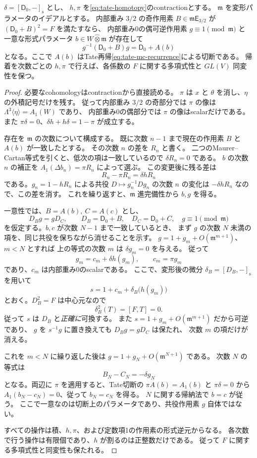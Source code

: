 \begin{lemma}[Tate切断への形式的な帰着と一意性]
\label{lem:v12-marked-tate-slice}
$\delta=[\mathsf D_0,-]_{\mathrm s}$ とし、
$h,\pi$ を\eqref{eq:tate-homotopy}のcontractionとする。
$\mathfrak m$ を変形パラメータのイデアルとする。
内部重み $3/2$ の奇作用素 $B\in\mathfrak m\mathsf E_{3/2}$ が
$(\mathsf D_0+B)^2=F$ を満たすなら、
内部重み0の偶可逆作用素 $g\equiv1\pmod{\mathfrak m}$ と
一意な形式パラメータ $b\in W\widehat\otimes\mathfrak m$ が存在して
\[
 g^{-1}(\mathsf D_0+B)g=\mathsf D_0+A(b)
\]
となる。ここで $A(b)$ はTate再帰\eqref{eq:tate-mc-recurrence}による切断である。
帰着を次数ごとの $h,\pi$ で行えば、各係数の $F$ に関する多項式性と
$GL(V)$ 同変性を保つ。
\end{lemma}
\begin{proof}
必要なcohomologyはcontractionから直接読める。
$\pi$ は $x$ と $\theta$ を消し、$\eta$ の外積記号だけを残す。
従って内部重み $3/2$ の奇部分では $\pi$ の像は
$\Lambda^3\langle\eta\rangle=A_1(W)$ であり、
内部重み0の偶部分では $\pi$ の像はscalarだけである。
また $\pi\delta=0$、$\delta h+h\delta=1-\pi$ が成立する。

存在を $\mathfrak m$ の次数について構成する。
既に次数 $n-1$ まで現在の作用素 $B$ と $A(b)$ が一致したとする。
その次数 $n$ の差を $R_n$ と書く。
二つのMaurer--Cartan等式を引くと、低次の項は一致しているので
$\delta R_n=0$ である。
$b$ の次数 $n$ の補正を
$A_1(\Delta b_n)=\pi R_n$ によって選ぶ。
この変更後に残る差は
\[
 R_n-\pi R_n=\delta hR_n
\]
である。$g_n=1-hR_n$ による共役
$D\mapsto g_n^{-1}Dg_n$ の次数 $n$ の変化は
$-\delta hR_n$ なので、この差を消す。
これを繰り返すと、$\mathfrak m$ 進完備性から $b,g$ を得る。

一意性では、$B=A(b),\ C=A(c)$ とし、
\[
 D_Bg=gD_C,\qquad D_B=\mathsf D_0+B,\quad
 D_C=\mathsf D_0+C,\quad g\equiv1\pmod{\mathfrak m}
\]
を仮定する。$b,c$ が次数 $N-1$ まで一致しているとき、
まず $g$ の次数 $N$ 未満の項を、同じ共役を保ちながら消せることを示す。
$g=1+g_m+O(\mathfrak m^{m+1})$、$m<N$ とすれば
上の等式の次数 $m$ は $\delta g_m=0$ を与える。
従って
\[
 g_m=c_m+\delta h(g_m),\qquad c_m=\pi g_m
\]
であり、$c_m$ は内部重み0のscalarである。
ここで、変形後の微分 $\delta_B=[D_B,-]_{\mathrm s}$ を用いて
\[
 s=1+c_m+\delta_B\bigl(h(g_m)\bigr)
\]
とおく。$D_B^2=F$ は中心元なので
\[
 \delta_B^2(T)=[F,T]=0.
\]
従って $s$ は $D_B$ と\emph{正確に}可換する。
また $s=1+g_m+O(\mathfrak m^{m+1})$ だから可逆であり、
$g$ を $s^{-1}g$ に置き換えても $D_Bg=gD_C$ は保たれ、
次数 $m$ の項だけが消える。

これを $m<N$ に繰り返した後は $g=1+g_N+O(\mathfrak m^{N+1})$ である。
次数 $N$ の等式は
\[
 B_N-C_N=-\delta g_N
\]
となる。両辺に $\pi$ を適用すると、Tate切断の
$\pi A(b)=A_1(b)$ と $\pi\delta=0$ から
$A_1(b_N-c_N)=0$、従って $b_N=c_N$ を得る。
$N$ に関する帰納法で $b=c$ が従う。
ここで一意なのは切断上のパラメータであり、共役作用素 $g$ 自体ではない。

すべての操作は積、$h,\pi$、および定数項1の作用素の形式逆元からなる。
各次数で行う操作は有限個であり、$h$ が割るのは正整数だけである。
従って $F$ に関する多項式性と同変性も保たれる。
\end{proof}

